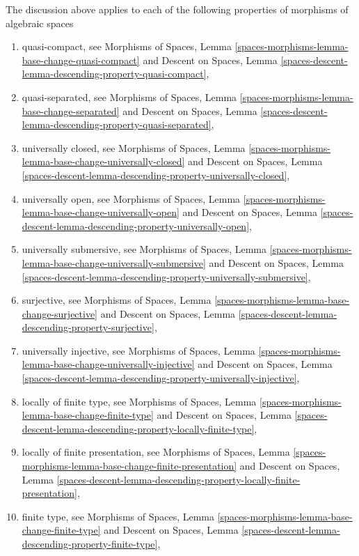 \medskip\noindent
The discussion above applies to each of the following properties of
morphisms of algebraic spaces
\begin{enumerate}
\item quasi-compact, see
Morphisms of Spaces,
Lemma \ref{spaces-morphisms-lemma-base-change-quasi-compact}
and
Descent on Spaces,
Lemma \ref{spaces-descent-lemma-descending-property-quasi-compact},
\item quasi-separated, see
Morphisms of Spaces,
Lemma \ref{spaces-morphisms-lemma-base-change-separated}
and
Descent on Spaces,
Lemma \ref{spaces-descent-lemma-descending-property-quasi-separated},
\item universally closed, see
Morphisms of Spaces,
Lemma \ref{spaces-morphisms-lemma-base-change-universally-closed}
and
Descent on Spaces,
Lemma \ref{spaces-descent-lemma-descending-property-universally-closed},
\item universally open, see
Morphisms of Spaces,
Lemma \ref{spaces-morphisms-lemma-base-change-universally-open}
and
Descent on Spaces,
Lemma \ref{spaces-descent-lemma-descending-property-universally-open},
\item universally submersive, see
Morphisms of Spaces,
Lemma \ref{spaces-morphisms-lemma-base-change-universally-submersive}
and
Descent on Spaces,
Lemma \ref{spaces-descent-lemma-descending-property-universally-submersive},
\item surjective, see
Morphisms of Spaces,
Lemma \ref{spaces-morphisms-lemma-base-change-surjective}
and
Descent on Spaces,
Lemma \ref{spaces-descent-lemma-descending-property-surjective},
\item universally injective, see
Morphisms of Spaces,
Lemma \ref{spaces-morphisms-lemma-base-change-universally-injective}
and
Descent on Spaces,
Lemma \ref{spaces-descent-lemma-descending-property-universally-injective},
\item locally of finite type, see
Morphisms of Spaces,
Lemma \ref{spaces-morphisms-lemma-base-change-finite-type}
and
Descent on Spaces,
Lemma \ref{spaces-descent-lemma-descending-property-locally-finite-type},
\item locally of finite presentation, see
Morphisms of Spaces,
Lemma \ref{spaces-morphisms-lemma-base-change-finite-presentation}
and
Descent on Spaces, Lemma
\ref{spaces-descent-lemma-descending-property-locally-finite-presentation},
\item finite type, see
Morphisms of Spaces,
Lemma \ref{spaces-morphisms-lemma-base-change-finite-type}
and
Descent on Spaces,
Lemma \ref{spaces-descent-lemma-descending-property-finite-type},

\end{enumerate}
